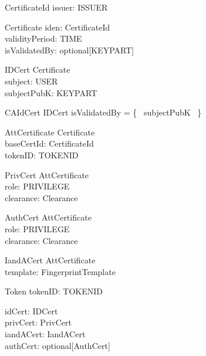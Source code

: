\begin{schema}{CertificateId}
	issuer: ISSUER
\end{schema}

\begin{schema}{Certificate}
        iden: CertificateId
\\	validityPeriod: \power TIME
\\      isValidatedBy: optional[KEYPART]
\end{schema}

\begin{schema}{IDCert}
	Certificate
\\      subject: USER
\\      subjectPubK: KEYPART
\end{schema}

\begin{schema}{CAIdCert}
        IDCert
\where
        isValidatedBy = \{~ subjectPubK ~\} 
\end{schema}

\begin{zed}
[ TOKENID ]
\end{zed}

\begin{schema}{AttCertificate}
        Certificate
\\      baseCertId: CertificateId      
\\      tokenID: TOKENID 
\end{schema}

\begin{schema}{PrivCert}
	AttCertificate
\\	role: PRIVILEGE
\\	clearance: Clearance
\end{schema}

\begin{schema}{AuthCert}
	AttCertificate
\\	role: PRIVILEGE
\\	clearance: Clearance
\end{schema}

\begin{schema}{IandACert}
	AttCertificate
\\	template: FingerprintTemplate
\end{schema}

\begin{schema}{Token}
	tokenID: TOKENID

\also	idCert: IDCert
\\	privCert: PrivCert
\\	iandACert: IandACert
\\	authCert: optional[AuthCert]
\end{schema}

